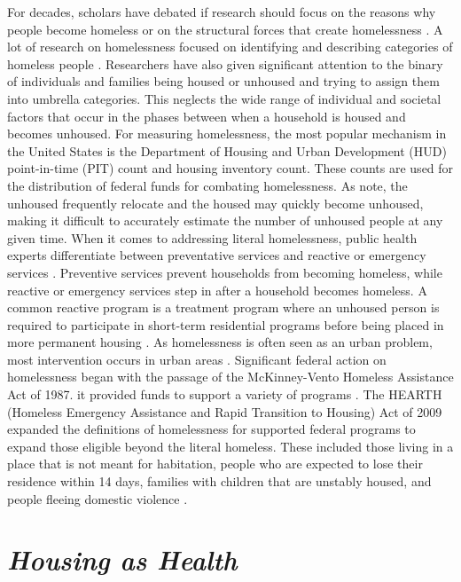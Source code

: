 For decades, scholars have debated if research should focus on the reasons why people become homeless or on the structural forces that create homelessness \citep{shlay_social_2003}. A lot of research on homelessness focused on identifying and describing categories of homeless people \citep{lee_homelessness_2021}. Researchers have also given significant attention to the binary of individuals and families being housed or unhoused and trying to assign them into umbrella categories. This neglects the wide range of individual and societal factors that occur in the phases between when a household is housed and becomes unhoused. For measuring homelessness, the most popular mechanism in the United States is the Department of Housing and Urban Development (HUD) point-in-time (PIT) count and housing inventory count. These counts are used for the distribution of federal funds for combating homelessness. As \citet{agans_enumerating_2014}  note, the unhoused frequently relocate and the housed may quickly become unhoused, making it difficult to accurately estimate the number of unhoused people at any given time. When it comes to addressing literal homelessness, public health experts differentiate between preventative services and reactive or emergency services \citep{oregan_how_2021}. Preventive services prevent households from becoming homeless, while reactive or emergency services step in after a household becomes homeless. A common reactive program is a treatment program where an unhoused person is required to participate in short-term residential programs before being placed in more permanent housing \citep{evans_reducing_2019}. As homelessness is often seen as an urban problem, most intervention occurs in urban areas \citep{gleason_using_2021}. Significant federal action on homelessness began with the passage of the McKinney-Vento Homeless Assistance Act of 1987. it provided funds to support a variety of programs  \citep{evans_reducing_2019}. The HEARTH (Homeless Emergency Assistance and Rapid Transition to Housing) Act of 2009 expanded the definitions of homelessness for supported federal programs to expand those eligible beyond the literal homeless. These included those living in a place that is not meant for habitation, people who are expected to lose their residence within 14 days, families with children that are unstably housed, and people fleeing domestic violence  \citep{evans_reducing_2019}. %


\section{\textit{Housing as Health}}

